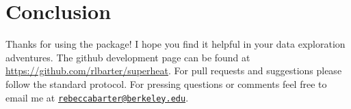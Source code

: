 \documentclass[]{book}
\theoremstyle{definition}
\theoremstyle{definition}
\theoremstyle{remark}
\begin{document}
\chapter{Conclusion}\label{conclusion}

Thanks for using the package! I hope you find it helpful in your data
exploration adventures. The github development page can be found at
\url{https://github.com/rlbarter/superheat}. For pull requests and
suggestions please follow the standard protocol. For pressing questions
or comments feel free to email me at
\href{mailto:rebeccabarter@berkeley.edu}{\nolinkurl{rebeccabarter@berkeley.edu}}.
\end{document}
